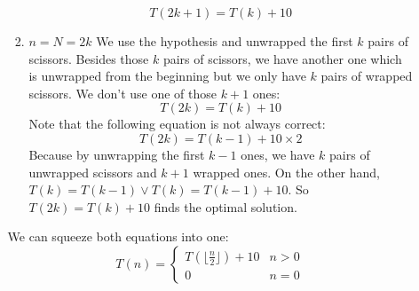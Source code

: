 \documentclass{book}
\begin{document}
\begin{itemize}
\begin{itemize}
\begin{enumerate}
    			\begin{equation*}
    				T(2k + 1) = T(k) + 10
    			\end{equation*}
    			\item $n = N = 2k$ We use the hypothesis and unwrapped the first $k$ pairs of scissors. Besides those $k$ pairs of scissors, we have another one which is unwrapped from the beginning but we only have $k$ pairs of wrapped scissors. We don't use one of those $k + 1$ ones:
    			\begin{equation*}
    				T(2k) = T(k) + 10
    			\end{equation*}
    			Note that the following equation is not always correct:
    			\begin{equation*}
    				T(2k) = T(k - 1) + 10 \times 2
    			\end{equation*}
    			Because by unwrapping the first $k - 1$ ones, we have $k$ pairs of unwrapped scissors and $k + 1$ wrapped ones. On the other hand, $T(k) = T(k - 1) \lor T(k) = T(k - 1) + 10$. So $T(2k) = T(k) + 10$ finds the optimal solution.
    		\end{enumerate}
    		We can squeeze both equations into one:
    		\begin{equation*}
    			T(n) = \begin{cases}
    				T(\lfloor \frac{n}{2} \rfloor) + 10 & n > 0 \\
    				0 & n = 0
    			\end{cases}
    		\end{equation*}    	
    	\end{itemize}	
	\end{itemize}
	
\end{document}
